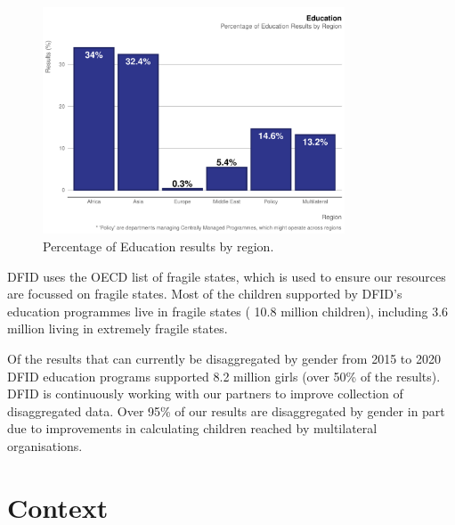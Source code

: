 \begin{figure}[htbp]
	\centering
\begin{knitrout}
\color{fgcolor}
\includegraphics[width=0.8\textwidth]{figs/education_region_plot-1} 

\end{knitrout}
	\caption{Percentage of Education results by region.}
	\label{fig:edu_region_plot}
\end{figure}

DFID uses the OECD list of fragile states, which is used to ensure our resources are focussed on fragile states. %
Most of the children supported by DFID's education programmes live in fragile states (
10.8
million children), including
3.6
million living in extremely fragile states. %

Of the results that can currently be disaggregated by gender from 2015 to 2020 DFID education programs supported
8.2
million girls (over 50\% of the results). %
DFID is continuously working with our partners to improve collection of disaggregated data.
Over 95\% of our results are disaggregated by gender in part due to improvements in calculating children reached by multilateral organisations. %


\section{Context}

